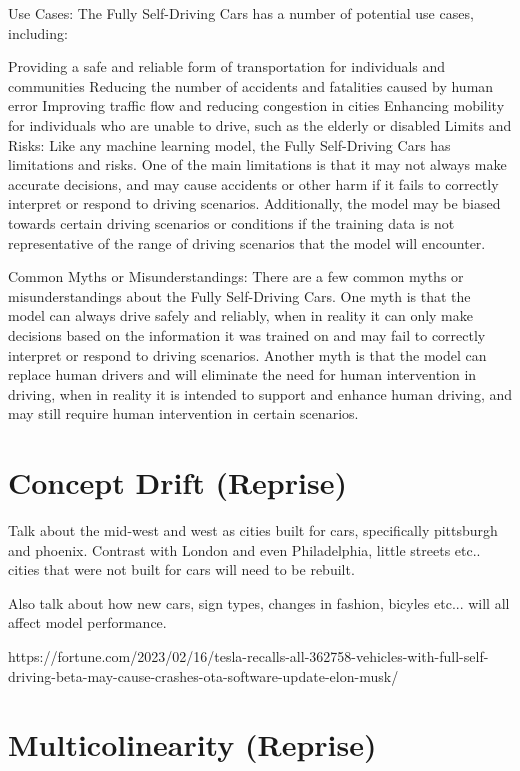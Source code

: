 Use Cases:
The Fully Self-Driving Cars has a number of potential use cases, including:

Providing a safe and reliable form of transportation for individuals and communities
Reducing the number of accidents and fatalities caused by human error
Improving traffic flow and reducing congestion in cities
Enhancing mobility for individuals who are unable to drive, such as the elderly or disabled
Limits and Risks:
Like any machine learning model, the Fully Self-Driving Cars has limitations and risks. One of the main limitations is that it may not always make accurate decisions, and may cause accidents or other harm if it fails to correctly interpret or respond to driving scenarios. Additionally, the model may be biased towards certain driving scenarios or conditions if the training data is not representative of the range of driving scenarios that the model will encounter.

Common Myths or Misunderstandings:
There are a few common myths or misunderstandings about the Fully Self-Driving Cars. One myth is that the model can always drive safely and reliably, when in reality it can only make decisions based on the information it was trained on and may fail to correctly interpret or respond to driving scenarios. Another myth is that the model can replace human drivers and will eliminate the need for human intervention in driving, when in reality it is intended to support and enhance human driving, and may still require human intervention in certain scenarios.

\section{Concept Drift (Reprise)}

Talk about the mid-west and west as cities built for cars, specifically pittsburgh and phoenix. Contrast with London and even Philadelphia, little streets etc.. cities that were not built for cars will need to be rebuilt.

Also talk about how new cars, sign types, changes in fashion, bicyles etc... will all affect model performance.

https://fortune.com/2023/02/16/tesla-recalls-all-362758-vehicles-with-full-self-driving-beta-may-cause-crashes-ota-software-update-elon-musk/

\section{Multicolinearity (Reprise)}

